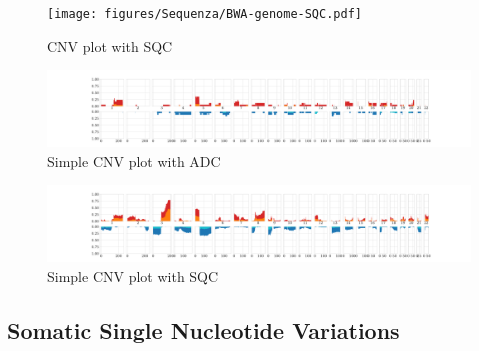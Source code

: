 \documentclass[a4paper]{article}
\begin{document}
            \begin{figure}[htbp]
                \centering
                \texttt{[image: figures/Sequenza/BWA-genome-SQC.pdf]}
                \caption{CNV plot with SQC}
                \label{fig:CNV-SQC}
            \end{figure}

            \begin{figure}[htbp]
                \centering
                \includegraphics[width=\linewidth]{figures/Sequenza/BWA-simple-ADC.pdf}
                \caption{Simple CNV plot with ADC}
                \label{fig:SimpleCNV-ADC}
            \end{figure}

            \begin{figure}[htbp]
                \centering
                \includegraphics[width=\linewidth]{figures/Sequenza/BWA-simple-SQC.pdf}
                \caption{Simple CNV plot with SQC}
                \label{fig:SimpleCNV-SQC}
            \end{figure}

        \subsection{Somatic Single Nucleotide Variations}
\end{document}
